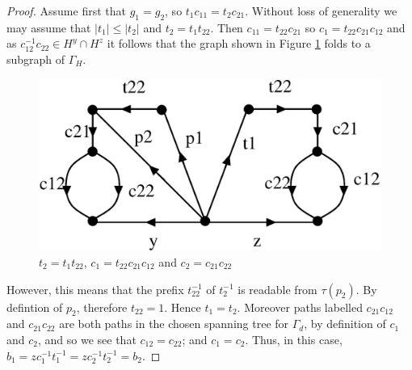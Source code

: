 \documentclass[a4paper,12pt]{article}
\newcommand{\G}{\Gamma }
\renewcommand{\t}{\tau }
\numberwithin{equation}{section}
\numberwithin{figure}{section}
\begin{document}
{\begin{proof}
Assume first that $g_1=g_2$, so $t_1c_{11}=t_2c_{21}$. Without loss of generality we may assume that $|t_1|\le |t_2|$ and
$t_2=t_1t_{22}$. Then $c_{11}=t_{22}c_{21}$ so $c_1=t_{22}c_{21}c_{12}$ and as $c_{12}^{-1}c_{22}\in H^y\cap H^z$ 
it follows that the graph shown in Figure \ref{fig:transv1} folds to 
a subgraph of $\G_H$. 
\begin{figure}
\begin{center}
\includegraphics[scale=0.6]{transv1.eps}
\caption{$t_2=t_1t_{22}$, $c_1=t_{22}c_{21}c_{12}$ and $c_2=c_{21}c_{22}$}\label{fig:transv1}
\end{center}
\end{figure}
However, this means that the prefix $t_{22}^{-1}$ of $t_2^{-1}$ is readable from $\t(p_2)$. By defintion
of $p_2$, therefore $t_{22}=1$. Hence $t_1=t_2$. Moreover  
 paths labelled $c_{21}c_{12}$ and $c_{21}c_{22}$ are both paths in the chosen spanning tree 
for $\G_d$, by definition of $c_1$ and $c_2$, and so we see that $c_{12}=c_{22}$; and $c_1=c_2$. Thus, in this case,
$b_1=zc_1^{-1}t_1^{-1}=zc_2^{-1}t_2^{-1}=b_2$. 


\end{proof}}
\end{document}
